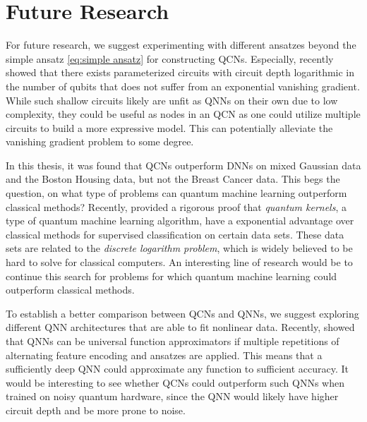

\section{Future Research}\label{sec:future}
For future research, we suggest experimenting with different ansatzes beyond the simple ansatz \cref{eq:simple ansatz} for constructing QCNs. Especially, \citet{Cerezo_2021} recently showed that there exists parameterized circuits with circuit depth logarithmic in the number of qubits that does not suffer from an exponential vanishing gradient. While such shallow circuits likely are unfit as QNNs on their own due to low complexity, they could be useful as nodes in an QCN as one could utilize multiple circuits to build a more expressive model. This can potentially alleviate the vanishing gradient problem to some degree.

In this thesis, it was found that QCNs outperform DNNs on mixed Gaussian data and the Boston Housing data, but not the Breast Cancer data. This begs the question, on what type of problems can quantum machine learning outperform classical methods? Recently, \citet{Liu_2021} provided a rigorous proof that \emph{quantum kernels}, a type of quantum machine learning algorithm, have a exponential advantage over classical methods for supervised classification on certain data sets. These data sets are related to the \emph{discrete logarithm problem}, which is widely believed to be hard to solve for classical computers. An interesting line of research would be to continue this search for problems for which quantum machine learning could outperform classical methods. 

To establish a better comparison between QCNs and QNNs, we suggest exploring different QNN architectures that are able to fit nonlinear data. Recently, \citet{Schuld_2021} showed that QNNs can be universal function approximators if multiple repetitions of alternating feature encoding and ansatzes are applied. This means that a sufficiently deep QNN could approximate any function to sufficient accuracy. It would be interesting to see whether QCNs could outperform such QNNs when trained on noisy quantum hardware, since the QNN would likely have higher circuit depth and be more prone to noise.


